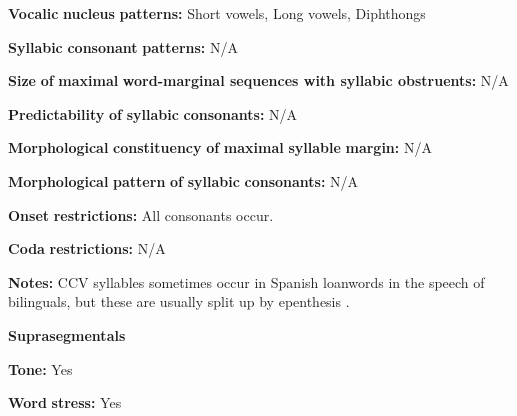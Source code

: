 \begin{styleBody}
\textbf{Vocalic} \textbf{nucleus} \textbf{patterns:} Short vowels, Long vowels, Diphthongs
\end{styleBody}

\begin{styleBody}
\textbf{Syllabic} \textbf{consonant} \textbf{patterns:} N/A
\end{styleBody}

\begin{styleBody}
\textbf{Size} \textbf{of} \textbf{maximal} \textbf{word{}-marginal sequences with syllabic obstruents:} N/A
\end{styleBody}

\begin{styleBody}
\textbf{Predictability} \textbf{of} \textbf{syllabic} \textbf{consonants:} N/A
\end{styleBody}

\begin{styleBody}
\textbf{Morphological} \textbf{constituency} \textbf{of} \textbf{maximal} \textbf{syllable} \textbf{margin:} N/A
\end{styleBody}

\begin{styleBody}
\textbf{Morphological} \textbf{pattern} \textbf{of} \textbf{syllabic} \textbf{consonants:} N/A
\end{styleBody}

\begin{styleBody}
\textbf{Onset} \textbf{restrictions:} All consonants occur.
\end{styleBody}

\begin{styleBody}
\textbf{Coda} \textbf{restrictions:} N/A
\end{styleBody}

\begin{styleBody}
\textbf{Notes:} CCV syllables sometimes occur in Spanish loanwords in the speech of bilinguals, but these are usually split up by epenthesis \citep[76]{Olawsky2006}.
\end{styleBody}

\begin{styleBody}
\textbf{Suprasegmentals}
\end{styleBody}

\begin{styleBody}
\textbf{Tone:} Yes
\end{styleBody}

\begin{styleBody}
\textbf{Word} \textbf{stress:} Yes
\end{styleBody}

